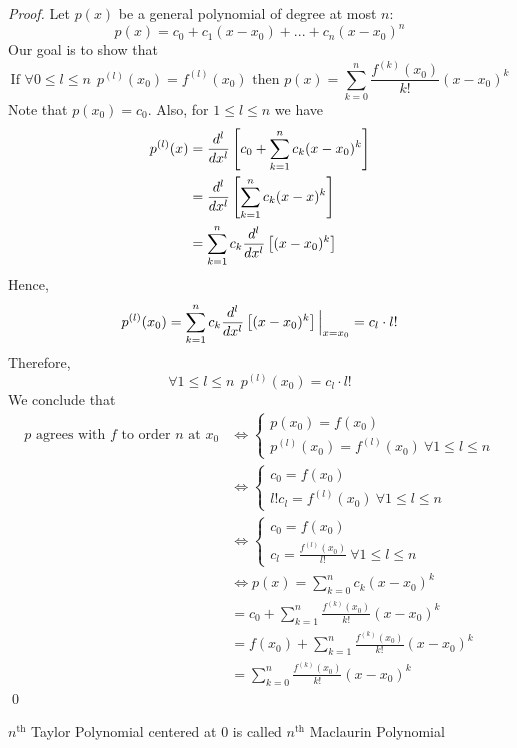 \begin{proof}
    Let $p(x)$ be a general polynomial of degree at most $n$:
    $$
    p(x) = c_0 + c_1(x-x_0) + ... + c_n(x-x_0)^n
    $$
    Our goal is to show that
    $$
    \text{If $\forall 0 \leq l \leq n ~~p^{(l)}(x_0)=f^{(l)}(x_0)$ then $p(x) = \sum_{k=0}^{n}\frac{f^{(k)}(x_0)}{k!}(x-x_0)^k$}
    $$
    Note that $p(x_0)=c_0.$ Also, for $1 \leq l \leq n$ we have
    \begin{align*}
        p^{(l)}(x) &= \ddx{c_0 + \sum_{k=1}^{n}c_k (x-x_0)^k}{l} \\ 
        &= \ddx{\sum_{k=1}^{n}c_k(x-x)^k}{l} \\
        &= \sum_{k=1}^{n}c_k \ddx{(x-x_0)^k}{l}
    \end{align*}
    Hence,
    $$
    p^{(l)}(x_0) = \sum_{k=1}^{n}c_k \ddx{(x-x_0)^k}{l} \Big|_{x=x_0} = c_l \cdot l!
    $$
    Therefore,
    $$  
    \forall 1 \leq l \leq n ~~p^{(l)}(x_0) = c_l \cdot l!
    $$
    We conclude that
    \begin{align*}
        \text{$p$ agrees with $f$ to order $n$ at $x_0$} &\iff \begin{cases*}
            p(x_0) = f(x_0) \\
            p^{(l)}(x_0) = f^{(l)}(x_0) ~\forall 1 \leq l \leq n
        \end{cases*} \\
        &\iff \begin{cases*}
            c_0 = f(x_0) \\
            l! c_l = f^{(l)}(x_0) ~\forall 1 \leq l \leq n
        \end{cases*} \\ 
        &\iff \begin{cases*}
            c_0 = f(x_0) \\
            c_l = \frac{f^{(l)}(x_0)}{l!} ~\forall 1 \leq l \leq n
        \end{cases*} \\ 
        &\iff p(x) = \sum_{k=0}^{n}c_k(x-x_0)^k \\ 
        &= c_0 + \sum_{k=1}^{n} \frac{f^{(k)}(x_0)}{k!}(x-x_0)^k \\
        &= f(x_0) + \sum_{k=1}^{n}\frac{f^{(k)}(x_0)}{k!}(x-x_0)^k \\
        &= \sum_{k=0}^{n}\frac{f^{(k)}(x_0)}{k!}(x-x_0)^k
    \end{align*}
    \qed
\end{proof}

\begin{note}
$n^{\text{th}}$ Taylor Polynomial centered at $0$ is called $n^{\text{th}}$ Maclaurin Polynomial
\end{note}

